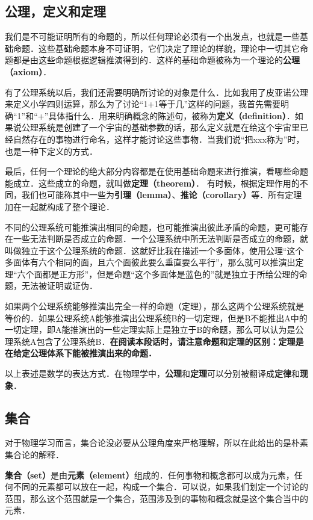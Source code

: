 \subsection{公理，定义和定理}
我们是不可能证明所有的命题的，所以任何理论必须有一个出发点，也就是一些基础命题．这些基础命题本身不可证明，它们决定了理论的样貌，理论中一切其它命题都是由这些命题根据逻辑推演得到的．这样的基础命题被称为一个理论的\textbf{公理（axiom）}．

有了公理系统以后，我们还需要明确所讨论的对象是什么．比如我用了皮亚诺公理来定义小学四则运算，那么为了讨论“1+1等于几”这样的问题，我首先需要明确“1”和“+”具体指什么．用来明确概念的陈述句，被称为\textbf{定义（definition）}．如果说公理系统是创建了一个宇宙的基础参数的话，那么定义就是在给这个宇宙里已经自然存在的事物进行命名，这样才能讨论这些事物．当我们说“把xxx称为”时，也是一种下定义的方式．

最后，任何一个理论的绝大部分内容都是在使用基础命题来进行推演，看哪些命题能成立．这些成立的命题，就叫做\textbf{定理（theorem）}． 有时候，根据定理作用的不同，我们也可能称其中一些为\textbf{引理（lemma）}、\textbf{推论（corollary）}等．所有定理加在一起就构成了整个理论．

不同的公理系统可能推演出相同的命题，也可能推演出彼此矛盾的命题，更可能存在一些无法判断是否成立的命题．一个公理系统中所无法判断是否成立的命题，就叫做独立于这个公理系统的命题．这就好比我在描述一个多面体，使用公理“这个多面体有六个相同的面，且六个面彼此要么垂直要么平行”，那么就可以推演出定理“六个面都是正方形”，但是命题“这个多面体是蓝色的”就是独立于所给公理的命题，无法被证明或证伪．

如果两个公理系统能够推演出完全一样的命题（定理），那么这两个公理系统就是等价的．如果公理系统A能够推演出公理系统B的一切定理，但是B不能推出A中的一切定理，即A能推演出的一些定理实际上是独立于B的命题，那么可以认为是公理系统A包含了公理系统B．\textbf{在阅读本段话时，请注意命题和定理的区别：定理是在给定公理体系下能被推演出来的命题．}

以上表述是数学的表达方式．在物理学中，\textbf{公理}和\textbf{定理}可以分别被翻译成\textbf{定律}和\textbf{现象}． 

\subsection{集合}

对于物理学习而言，集合论没必要从公理角度来严格理解，所以在此给出的是朴素集合论的解释．

\textbf{集合（set）}是由\textbf{元素（element）}组成的．任何事物和概念都可以成为元素，任何不同的元素都可以放在一起，构成一个集合．可以说，如果我们划定一个讨论的范围，那么这个范围就是一个集合，范围涉及到的事物和概念就是这个集合当中的元素．

